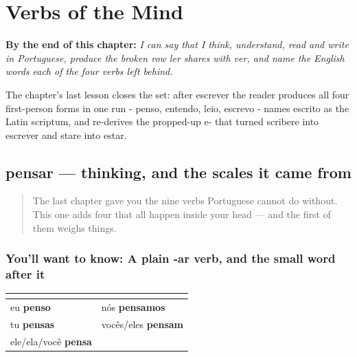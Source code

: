 
\chapter{Verbs of the Mind}
\label{ch:pt-mind-verbs}

\begin{chapteropening}
\textbf{By the end of this chapter:} \emph{I can say that I think, understand, read and write in Portuguese, produce the broken row ler shares with ver, and name the English words each of the four verbs left behind.}

The chapter's last lesson closes the set: after escrever the reader produces all four first-person forms in one run - penso, entendo, leio, escrevo - names escrito as the Latin scriptum, and re-derives the propped-up e- that turned scribere into escrever and stare into estar.
\end{chapteropening}

\section[pensar]{pensar — thinking, and the scales it came from}

\label{lesson:PT-C19-pensar}



\begin{quote}
The last chapter gave you the nine verbs Portuguese cannot do without. This one adds four that all happen inside your head — and the first of them weighs things.
\end{quote}

\subsection*{You'll want to know: A plain -ar verb, and the small word after it}
\noindent
\begin{tabularx}{\linewidth}{@{}>{\raggedright\arraybackslash}X>{\raggedright\arraybackslash}X@{}}
\toprule
\textbf{} & \textbf{} \\
\midrule
eu \textbf{penso} & nós \textbf{pensamos} \\
tu \textbf{pensas} & vocês/eles \textbf{pensam} \\
ele/ela/você \textbf{pensa} &  \\
\bottomrule
\end{tabularx}


